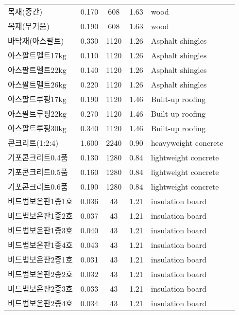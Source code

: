 \begin{longtable}{llcclc}
  목재(중간) &   0.170 &  608 & 1.63 & wood & \cite{ashrae_f18} \\
  목재(무거움) &   0.190 &  608 & 1.63 & wood & \cite{ashrae_f18} \\
  바닥재(아스팔트) &   0.330 & 1120 & 1.26 & Asphalt shingles & \cite{ashrae_f18} \\
  아스팔트펠트17kg &   0.110 & 1120 & 1.26 & Asphalt shingles & \cite{ashrae_f18} \\
  아스팔트펠트22kg &   0.140 & 1120 & 1.26 & Asphalt shingles & \cite{ashrae_f18} \\
  아스팔트펠트26kg &   0.220 & 1120 & 1.26 & Asphalt shingles & \cite{ashrae_f18} \\
  아스팔트루핑17kg &   0.190 & 1120 & 1.46 & Built-up roofing & \cite{ashrae_f18} \\
  아스팔트루핑22kg &   0.270 & 1120 & 1.46 & Built-up roofing & \cite{ashrae_f18} \\
  아스팔트루핑30kg &   0.340 & 1120 & 1.46 & Built-up roofing & \cite{ashrae_f18} \\
  콘크리트(1:2:4) &   1.600 & 2240 & 0.90 & heavyweight concrete & \cite{ashrae_f18} \\
  기포콘크리트0.4품 &   0.130 & 1280 & 0.84 & lightweight concrete & \cite{ashrae_f18} \\
  기포콘크리트0.5품 &   0.160 & 1280 & 0.84 & lightweight concrete & \cite{ashrae_f18} \\
  기포콘크리트0.6품 &   0.190 & 1280 & 0.84 & lightweight concrete & \cite{ashrae_f18} \\
  비드법보온판1종1호 &   0.036 &   43 & 1.21 & insulation board & \cite{ashrae_f18} \\
  비드법보온판1종2호 &   0.037 &   43 & 1.21 & insulation board & \cite{ashrae_f18} \\
  비드법보온판1종3호 &   0.040 &   43 & 1.21 & insulation board & \cite{ashrae_f18} \\
  비드법보온판1종4호 &   0.043 &   43 & 1.21 & insulation board & \cite{ashrae_f18} \\
  비드법보온판2종1호 &   0.031 &   43 & 1.21 & insulation board & \cite{ashrae_f18} \\
  비드법보온판2종2호 &   0.032 &   43 & 1.21 & insulation board & \cite{ashrae_f18} \\
  비드법보온판2종3호 &   0.033 &   43 & 1.21 & insulation board & \cite{ashrae_f18} \\
  비드법보온판2종4호 &   0.034 &   43 & 1.21 & insulation board & \cite{ashrae_f18} \\

\end{longtable}
